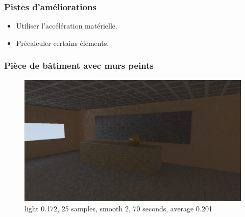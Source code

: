 \documentclass[handout]{beamer}
\begin{document}
\begin{frame}
    \frametitle{Pistes d'améliorations}

    \begin{itemize}
        \item Utiliser l'accélération matérielle.
        \item Précalculer certains éléments.
    \end{itemize}

\end{frame}

\begin{frame}
    \frametitle{Pièce de bâtiment avec murs peints}

    \begin{figure}
        \includegraphics[scale=0.25]{piece_peinture_triche.png}
        \caption{light 0.172, 25 samples, smooth 2, 70 seconds, average 0.201}
    \end{figure}

\end{frame}
\end{document}
